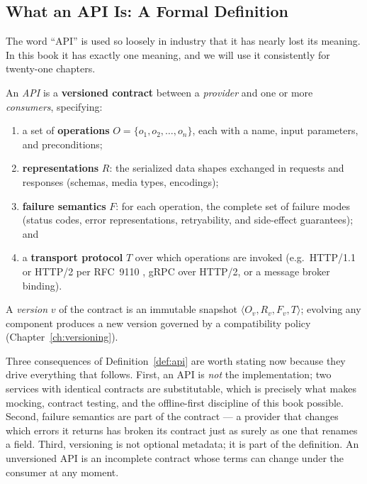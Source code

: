 \subsection{What an API Is: A Formal Definition}

The word ``API'' is used so loosely in industry that it has nearly lost its
meaning. In this book it has exactly one meaning, and we will use it
consistently for twenty-one chapters.

\begin{definition}
\label{def:api}
An \emph{API} is a \textbf{versioned contract} between a \emph{provider} and
one or more \emph{consumers}, specifying:
\begin{enumerate}
  \item a set of \textbf{operations} $O = \{o_1, o_2, \dots, o_n\}$, each with
        a name, input parameters, and preconditions;
  \item \textbf{representations} $R$: the serialized data shapes exchanged in
        requests and responses (schemas, media types, encodings);
  \item \textbf{failure semantics} $F$: for each operation, the complete set
        of failure modes (status codes, error representations, retryability,
        and side-effect guarantees); and
  \item a \textbf{transport protocol} $T$ over which operations are invoked
        (e.g.\ HTTP/1.1 or HTTP/2 per RFC~9110 \cite{rfc9110}, gRPC over
        HTTP/2, or a message broker binding).
\end{enumerate}
A \emph{version} $v$ of the contract is an immutable snapshot
$\langle O_v, R_v, F_v, T \rangle$; evolving any component produces a new
version governed by a compatibility policy (Chapter~\ref{ch:versioning}).
\end{definition}

Three consequences of Definition~\ref{def:api} are worth stating now because
they drive everything that follows. First, an API is \emph{not} the
implementation; two services with identical contracts are substitutable,
which is precisely what makes mocking, contract testing, and the
offline-first discipline of this book possible. Second, failure semantics are
part of the contract --- a provider that changes which errors it returns has
broken its contract just as surely as one that renames a field. Third,
versioning is not optional metadata; it is part of the definition. An
unversioned API is an incomplete contract whose terms can change under the
consumer at any moment.

